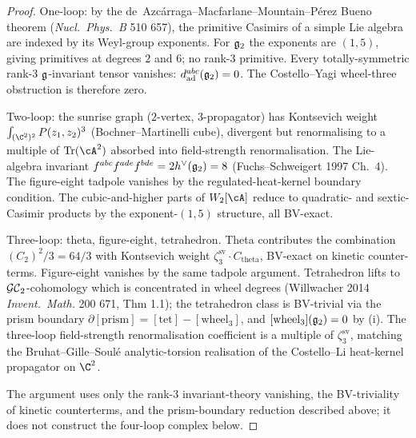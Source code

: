 \begin{proof}
One-loop: by the de~Azc\'arraga--Macfarlane--Mountain--P\'erez Bueno
theorem (\textit{Nucl.\ Phys.\ B} 510 657), the primitive Casimirs of
a simple Lie algebra are indexed by its Weyl-group exponents. For
$\mathfrak{g}_2$ the exponents are $(1, 5)$, giving primitives at degrees $2$
and $6$; no rank-$3$ primitive. Every totally-symmetric rank-$3$
$\mathfrak g$-invariant tensor vanishes: $d^{abc}_{\mathrm{ad}}(\mathfrak{g}_2) = 0$.
The Costello--Yagi wheel-three obstruction is therefore zero.

Two-loop: the sunrise graph ($2$-vertex, $3$-propagator) has
Kontsevich weight $\int_{(\C^2)^2} P(z_1, z_2)^3$ (Bochner--Martinelli
cube), divergent but renormalising to a multiple of
$\mathrm{Tr}(\cA^2)$ absorbed into field-strength renormalisation. The
Lie-algebra invariant $f^{abc} f^{ade} f^{bde} = 2 h^\vee(\mathfrak{g}_2) = 8$
(Fuchs--Schweigert 1997 Ch.~4). The figure-eight tadpole vanishes by
the regulated-heat-kernel boundary condition. The cubic-and-higher
parts of $W_2[\cA]$ reduce to quadratic- and sextic-Casimir products
by the exponent-$(1, 5)$ structure, all BV-exact.

Three-loop: theta, figure-eight, tetrahedron. Theta contributes the
combination $(C_2)^2 / 3 = 64/3$ with Kontsevich weight
$\zeta^{\mathrm{sv}}_3 \cdot C_{\mathrm{theta}}$, BV-exact on kinetic
counter-terms. Figure-eight vanishes by the same tadpole argument.
Tetrahedron lifts to $\mathcal{GC}_2$-cohomology which is concentrated in wheel
degrees (Willwacher 2014 \textit{Invent.\ Math.} 200 671, Thm 1.1);
the tetrahedron class is BV-trivial via the prism boundary
$\partial[\mathrm{prism}] = [\mathrm{tet}] - [\mathrm{wheel}_3]$, and
$[\mathrm{wheel}_3](\mathfrak{g}_2) = 0$ by (i). The three-loop field-strength
renormalisation coefficient is a multiple of $\zeta^{\mathrm{sv}}_3$,
matching the Bruhat--Gille--Soul\'e analytic-torsion realisation of
the Costello--Li heat-kernel propagator on $\C^2$.

The argument uses only the rank-$3$ invariant-theory vanishing, the
BV-triviality of kinetic counterterms, and the prism-boundary reduction
described above; it does not construct the four-loop complex below.
\end{proof}

